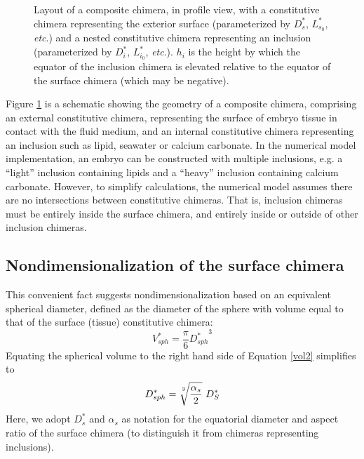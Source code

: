 \documentclass[10pt,a4paper]{article}
\def\etc{\emph{etc}.\xspace}
\begin{document}
\begin{figure}[t]
\begin{center}
{\begin{tikzpicture}
			\end{tikzpicture}
		}
	\end{center}
	\caption{Layout of a composite chimera, in profile view, with a constitutive chimera representing the exterior surface (parameterized by $D_s^*$, $L^*_{s_0}$, \etc) and a nested constitutive chimera representing an inclusion (parameterized by $D_i^*$, $L^*_{i_0}$, \etc). 
	$h_i$ is the height by which the equator of the inclusion chimera is elevated relative to the equator of the surface chimera (which may be negative). 
	} \label{chimera2}
\end{figure}
\noindent
Figure \ref{chimera2} is a schematic showing the geometry of a composite chimera, comprising an external constitutive chimera, representing the surface of embryo tissue in contact with the fluid medium, and an internal constitutive chimera representing an inclusion such as lipid, seawater or calcium carbonate.
In the numerical model implementation, an embryo can be constructed with multiple inclusions, e.g. a ``light'' inclusion containing lipids and a ``heavy'' inclusion containing calcium carbonate.
However, to simplify calculations, the numerical model assumes there are no intersections between constitutive chimeras.
That is, inclusion chimeras must be entirely inside the surface chimera, and entirely inside or outside of other inclusion chimeras.

\subsection{Nondimensionalization of the surface chimera}
This convenient fact suggests nondimensionalization based on an equivalent spherical diameter, defined as the diameter of the sphere with volume equal to that of the surface (tissue) constitutive chimera:
\begin{equation}\label{equivsphere}
	V_{sph}^* = \frac{\pi}{6} {D_{sph}^*}^3
\end{equation} 
Equating the spherical volume to the right hand side of Equation \ref{vol2} simplifies to
\begin{equation}\label{equivD}
	D_{sph}^* = \sqrt[\uproot{5}3]{\frac{\alpha_s}{2}} ~ D_S^*
\end{equation} 
Here, we adopt $D_s^*$ and $\alpha_s$ as notation for the equatorial diameter and aspect ratio of the surface chimera (to distinguish it from chimeras representing inclusions).
\end{document}
